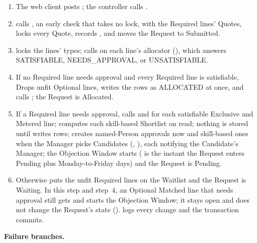 \begin{enumerate}
\item The web client posts ; the controller calls .
\item {} calls , an early check that takes no lock, with the Required lines' Quotes, locks every Quote, records , and moves the Request to Submitted.
\item {} locks the lines' types;  calls  on each line's allocator (), which answers SATISFIABLE, NEEDS\_APPROVAL, or UNSATISFIABLE.
\item If no Required line needs approval and every Required line is satisfiable,  Drops unfit Optional lines, writes the rows as ALLOCATED at once, and calls ; the Request is Allocated.
\item If a Required line needs approval,  calls  and  for each satisfiable Exclusive and Metered line;  computes each skill-based Shortlist on read; nothing is stored until  writes  rows;  creates named-Person approvals now and skill-based ones when the Manager picks Candidates (, ), each notifying the Candidate's Manager; the Objection Window starts ( is the instant the Request enters Pending plus  Monday-to-Friday days) and the Request is Pending.
\item Otherwise  puts the unfit Required lines on the Waitlist and the Request is Waiting. In this step and step~4, an Optional Matched line that needs approval still gets  and starts the Objection Window; it stays open and does not change the Request's state ().  logs every change and the transaction commits.
\end{enumerate}
\par\textbf{Failure branches.}
